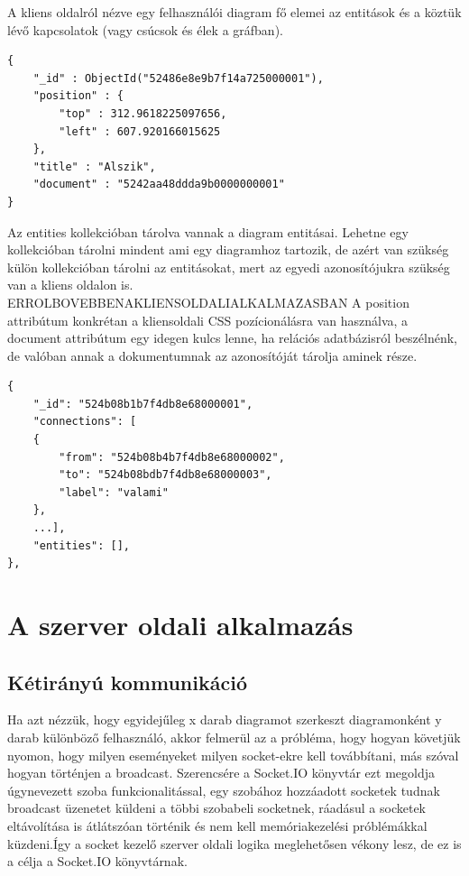 A kliens oldalról nézve egy felhasználói diagram fő elemei az entitások és a köztük lévő kapcsolatok (vagy csúcsok és élek a gráfban). 


\begin{lstlisting}
{
    "_id" : ObjectId("52486e8e9b7f14a725000001"),
    "position" : {
        "top" : 312.9618225097656,
        "left" : 607.920166015625
    },
    "title" : "Alszik",
    "document" : "5242aa48ddda9b0000000001"
}
\end{lstlisting}

Az entities kollekcióban tárolva vannak a diagram entitásai. Lehetne egy kollekcióban tárolni mindent ami egy diagramhoz tartozik, de azért van szükség külön kollekcióban tárolni az entitásokat, mert az egyedi azonosítójukra szükség van a kliens oldalon is. ERROLBOVEBBENAKLIENSOLDALIALKALMAZASBAN
A position attribútum konkrétan a kliensoldali CSS pozícionálásra van használva, a document attribútum egy idegen kulcs lenne, ha relációs adatbázisról beszélnénk, de valóban annak a dokumentumnak az azonosítóját tárolja aminek része.

\begin{lstlisting}
{
    "_id": "524b08b1b7f4db8e68000001",
    "connections": [
    {
        "from": "524b08b4b7f4db8e68000002",
        "to": "524b08bdb7f4db8e68000003",
        "label": "valami"
    },
    ...],
    "entities": [],
},
\end{lstlisting}


\section{A szerver oldali alkalmazás}


\subsection{Kétirányú kommunikáció}

Ha azt nézzük, hogy egyidejűleg x darab diagramot szerkeszt diagramonként y darab különböző felhasználó, akkor felmerül az a próbléma, hogy hogyan követjük nyomon, hogy milyen eseményeket milyen socket-ekre kell továbbítani, más szóval hogyan történjen a broadcast. Szerencsére a Socket.IO könyvtár ezt megoldja úgynevezett szoba funkcionalitással, egy szobához hozzáadott socketek tudnak broadcast üzenetet küldeni a többi szobabeli socketnek, ráadásul a socketek eltávolítása is átlátszóan történik és nem kell memóriakezelési próblémákkal küzdeni.Így a socket kezelő szerver oldali logika meglehetősen vékony lesz, de ez is a célja a Socket.IO könyvtárnak. 

